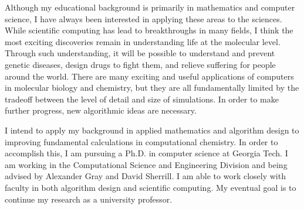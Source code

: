 \documentclass[twoside,leqno, 12pt]{article}
\begin{document}

%




Although my educational background is primarily in mathematics and computer science, I have always been interested in applying these areas to the sciences.  While scientific computing has lead to breakthroughs in many fields, I think the most exciting discoveries remain in understanding life at the molecular level.  Through such understanding, it will be possible to understand and prevent genetic diseases, design drugs to fight them, and relieve suffering for people around the world.  There are many exciting and useful applications of computers in molecular biology and chemistry, but they are all fundamentally limited by the tradeoff between the level of detail and size of simulations.  In order to make further progress, new algorithmic ideas are necessary.

I intend to apply my background in applied mathematics and algorithm design to improving fundamental calculations in computational chemistry.  In order to accomplish this, I am pursuing a Ph.D. in computer science at Georgia Tech.  I am working in the Computational Science and Engineering Division and being advised by Alexander Gray and David Sherrill.  I am able to work closely with faculty in both algorithm design and scientific computing.  My eventual goal is to continue my research as a university professor. 

\end{document}
